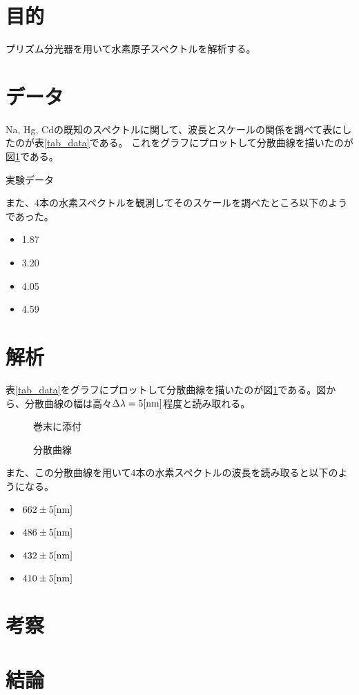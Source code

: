 \documentclass[uplatex,11pt]{jsarticle}
\newcommand{\dummyfig}[2]{
    \begin{figure}
        \begin{center}
            \begin{shadebox}
                巻末に添付
            \end{shadebox}
            \caption{#2}
            \label{fg_#1}
        \end{center}
    \end{figure}
}
\newcommand{\tab}[4]{ %
    \begin{table}[htb]
        \centering
        \caption{#3}
        
        \label{tab_#1}
    \end{table}
}
\newcommand{\fr}[1]{図\ref{fg_#1}}
\newcommand{\tr}[1]{表\ref{tab_#1}}
\begin{document}
\section{目的}

プリズム分光器を用いて水素原子スペクトルを解析する。

\section{データ}

Na, Hg, Cdの既知のスペクトルに関して、波長とスケールの関係を調べて表にしたのが\tr{data}である。
これをグラフにプロットして分散曲線を描いたのが\fr{bunsan}である。

\tab{data}{csv/bunsan.csv}{実験データ}{2}

また、4本の水素スペクトルを観測してそのスケールを調べたところ以下のようであった。

\begin{itemize}
  \item 1.87
  \item 3.20
  \item 4.05
  \item 4.59
\end{itemize}

\section{解析}

\tr{data}をグラフにプロットして分散曲線を描いたのが\fr{bunsan}である。図から、分散曲線の幅は高々$\Delta\lambda = 5[{\rm nm}]$程度と読み取れる。

\dummyfig{bunsan}{分散曲線}

また、この分散曲線を用いて4本の水素スペクトルの波長を読み取ると以下のようになる。

\begin{itemize}
    \item $662 \pm 5 [{\rm nm}]$
    \item $486 \pm 5 [{\rm nm}]$
    \item $432 \pm 5 [{\rm nm}]$
    \item $410 \pm 5 [{\rm nm}]$
\end{itemize}

\section{考察}



\section{結論}
\end{document}
